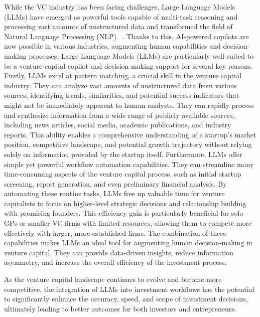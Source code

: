 \documentclass[a4paper, oneside]{discothesis}
\begin{document}
While the VC industry has been facing challenges, Large Language Models (LLMs) have emerged as powerful tools capable of multi-task reasoning and processing vast amounts of
unstructured data and transformed the field of Natural Language Processing (NLP) ~\cite{brown2020language}. Thanks to this, AI-powered copilots are now possible in various industries, augmenting human capabilities and decision-making processes.
 Large Language Models (LLMs) are particularly well-suited to be a venture capital copilot and decision-making support for several key reasons. 
Firstly, LLMs excel at pattern matching, a crucial skill in the venture capital industry. They can analyze vast amounts of unstructured data from various sources, 
identifying trends, similarities, and potential success indicators that might not be immediately apparent to human analysts.
They can rapidly process and synthesize information from a wide range of publicly available sources, including news articles, social media, academic publications, 
and industry reports. This ability enables a comprehensive understanding of a startup's market position, competitive landscape, and potential growth trajectory 
without relying solely on information provided by the startup itself.
Furthermore, LLMs offer simple yet powerful workflow automation capabilities. They can streamline many time-consuming aspects of the venture capital process, 
such as initial startup screening, report generation, and even preliminary financial analysis. By automating these routine tasks, LLMs free up valuable time 
for venture capitalists to focus on higher-level strategic decisions and relationship building with promising founders. This efficiency gain is particularly 
beneficial for solo GPs or smaller VC firms with limited resources, allowing them to compete more effectively with larger, more established firms.
The combination of these capabilities makes LLMs an ideal tool for augmenting human decision-making in venture capital. They can provide data-driven insights, reduce information asymmetry, and increase the overall efficiency of the investment process. 
 
As the venture capital landscape continues to evolve and become more competitive, the integration of LLMs into investment workflows has the potential to significantly enhance the accuracy, speed, and scope of investment decisions, ultimately leading to better outcomes for both investors and entrepreneurs.
\end{document}
